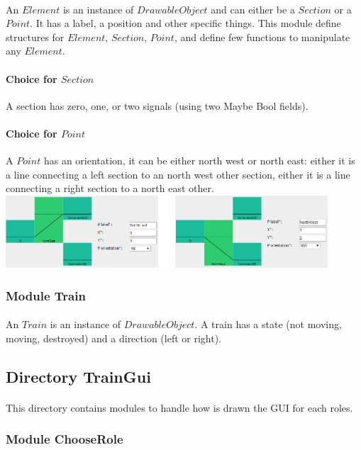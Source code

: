 \documentclass{article}
\begin{document}
				\paragraph{} An $Element$ is an instance of $DrawableObject$ and can either be a $Section$ or a $Point$. It has a label, a position and other specific things. This module define structures for $Element$, $Section$, $Point$, and define few functions to manipulate any $Element$.
				\paragraph{Choice for $Section$}
					A section has zero, one, or two signals (using two Maybe Bool fields).
				\paragraph{Choice for $Point$}
					A $Point$ has an orientation, it can be either north west or north east: either it is a line connecting a left section to an north west other section, either it is a line connecting a right section to a north east other.
					\includegraphics[width=12cm]{Point.png}
			\subsubsection{Module Train}
				\paragraph{} An $Train$ is an instance of $DrawableObject$. A train has a state (not moving, moving, destroyed) and a direction (left or right).
		\subsection{Directory TrainGui}
			\paragraph{} This directory contains modules to handle how is drawn the GUI for each roles.
			\subsubsection{Module ChooseRole}
\end{document}
